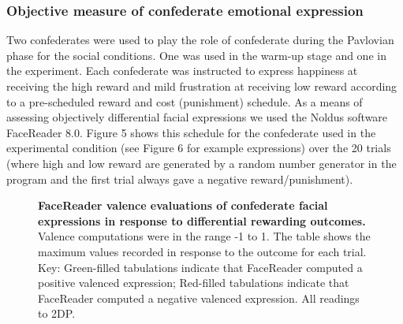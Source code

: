\documentclass[]{elsarticle} %
\begin{document}
\hypertarget{objective-measure-of-confederate-emotional-expression}{%
\subsubsection{Objective measure of confederate emotional
expression}\label{objective-measure-of-confederate-emotional-expression}}

Two confederates were used to play the role of confederate during the
Pavlovian phase for the social conditions. One was used in the warm-up
stage and one in the experiment. Each confederate was instructed to
express happiness at receiving the high reward and mild frustration at
receiving low reward according to a pre-scheduled reward and cost
(punishment) schedule. As a means of assessing objectively differential
facial expressions we used the Noldus software FaceReader 8.0. Figure 5
shows this schedule for the confederate used in the experimental
condition (see Figure 6 for example expressions) over the 20 trials
(where high and low reward are generated by a random number generator in
the program and the first trial always gave a negative
reward/punishment).

\begin{figure}
\centering
{}
\caption{\textbf{FaceReader valence evaluations of confederate facial expressions in response to differential rewarding outcomes.} Valence computations were in the range -1 to 1. The table shows the maximum values recorded in response to the outcome for each trial. Key: Green-filled tabulations indicate that FaceReader computed a positive valenced expression; Red-filled tabulations indicate that FaceReader computed a negative valenced expression. All readings to 2DP.}
\label{fig:fig6}
\end{figure}
\end{document}
